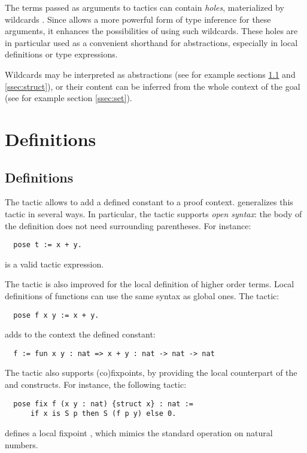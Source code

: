 The terms passed as arguments
to \ssr{} tactics can contain \emph{holes}, materialized by wildcards
\ssrC{_}.
Since \ssr{} allows a more powerful form of type inference for these
arguments, it enhances the possibilities of using such wildcards.
These holes are in particular used as a convenient shorthand for
abstractions, especially in local definitions or type expressions.

Wildcards may be interpreted as abstractions (see for example sections
\ref{ssec:pose} and \ref{ssec:struct}), or their content can be
inferred from the whole
context of the goal (see for example section \ref{ssec:set}).
\section{Definitions}

\subsection{Definitions}\label{ssec:pose}

The  tactic allows to add a defined constant to a
proof context. \ssr{} generalizes this tactic in several ways.
In particular, the \ssr{}  tactic supports \emph{open syntax}:
the body of
the definition does not need surrounding parentheses. For instance:
\begin{lstlisting}
  pose t := x + y.
\end{lstlisting}
is a valid tactic expression.

The  tactic is also improved for the
local definition of higher order terms.
Local definitions of functions can use the same syntax as
global ones. The tactic:
\begin{lstlisting}
  pose f x y := x + y.
\end{lstlisting}
adds to the context the defined constant:
\begin{lstlisting}
  f := fun x y : nat => x + y : nat -> nat -> nat
\end{lstlisting}

The \ssr{}  tactic also supports (co)fixpoints,
by providing the local counterpart of the
 and  constructs.
For instance, the following tactic:
\begin{lstlisting}
  pose fix f (x y : nat) {struct x} : nat :=
      if x is S p then S (f p y) else 0.
\end{lstlisting}
defines a local fixpoint , which mimics the standard 
operation on natural numbers.


